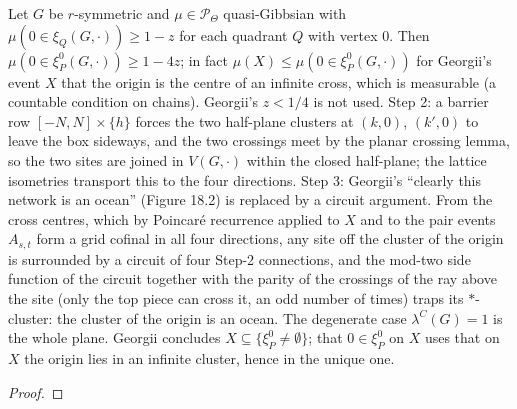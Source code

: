 \begin{theorem}
    Let $G$ be $r$-symmetric and $\mu \in \mathcal P_\Theta$ quasi-Gibbsian with
    $\mu(0 \in \xi_Q(G,\cdot)) \geq 1 - z$ for each quadrant $Q$ with vertex $0$. Then
    $\mu(0 \in \xi^0_P(G,\cdot)) \geq 1 - 4z$; in fact $\mu(X) \leq \mu(0 \in \xi^0_P(G,\cdot))$ for
    Georgii's event $X$ that the origin is the centre of an infinite cross, which is measurable
    (a countable condition on chains). Georgii's $z < 1/4$ is not used. Step 2: a barrier row
    $[-N,N]\times\{h\}$ forces the two half-plane clusters at $(k,0)$, $(k',0)$ to leave the box
    sideways, and the two crossings meet by the planar crossing lemma, so the two sites are joined
    in $V(G,\cdot)$ within the closed half-plane; the lattice isometries transport this to the
    four directions. Step 3: Georgii's ``clearly this network is an ocean'' (Figure 18.2) is
    replaced by a circuit argument. From the cross centres, which by Poincar\'e recurrence applied
    to $X$ and to the pair events $A_{s,t}$ form a grid cofinal in all four directions, any site
    off the cluster of the origin is surrounded by a circuit of four Step-2 connections, and the
    mod-two side function of the circuit together with the parity of the crossings of the ray
    above the site (only the top piece can cross it, an odd number of times) traps its
    $*$-cluster: the cluster of the origin is an ocean. The degenerate case $\lambda^C(G) = 1$ is
    the whole plane. Georgii concludes $X \subseteq \{\xi^0_P \neq \emptyset\}$; that
    $0 \in \xi^0_P$ on $X$ uses that on $X$ the origin lies in an infinite cluster, hence in the
    unique one.
\end{theorem}
\begin{proof}
    \leanok
\end{proof}

